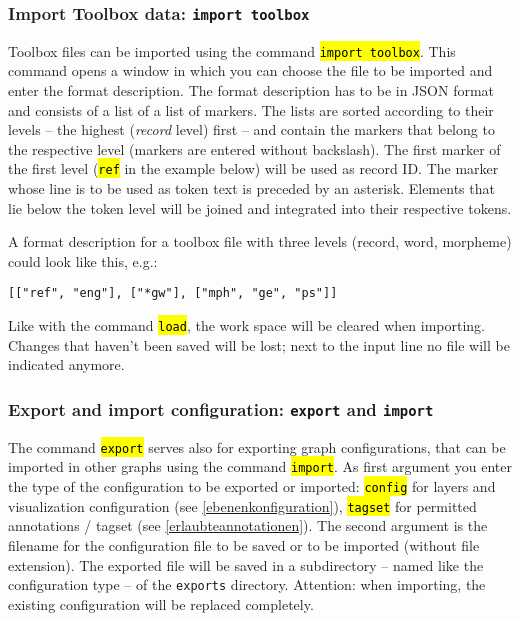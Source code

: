 \documentclass[12pt]{scrartcl}
\newcommand{\code}[1]{\hl{\texttt{#1}}}
\begin{document}
\subsubsection{Import Toolbox data: \texttt{import toolbox}}

Toolbox files can be imported using the command \code{import toolbox}.
This command opens a window in which you can choose the file to be imported and enter the format description.
The format description has to be in JSON format and consists of a list of a list of markers.
The lists are sorted according to their levels – the highest (\textit{record} level) first – and contain the markers that belong to the respective level (markers are entered without backslash).
The first marker of the first level (\code{ref} in the example below) will be used as record ID.
The marker whose line is to be used as token text is preceded by an asterisk.
Elements that lie below the token level will be joined and integrated into their respective tokens.

A format description for a toolbox file with three levels (record, word, morpheme) could look like this, e.g.:

\begin{lstlisting}[gobble=4]
	[["ref", "eng"], ["*gw"], ["mph", "ge", "ps"]]
\end{lstlisting}

Like with the command \code{load}, the work space will be cleared when importing.
Changes that haven’t been saved will be lost; next to the input line no file will be indicated anymore.


\subsubsection{Export and import configuration: \texttt{export} and \texttt{import}}

The command \code{export} serves also for exporting graph configurations, that can be imported in other graphs using the command \code{import}.
As first argument you enter the type of the configuration to be exported or imported: \code{config} for layers and visualization configuration (see \ref{ebenenkonfiguration}), \code{tagset} for permitted annotations / tagset (see \ref{erlaubteannotationen}).
The second argument is the filename for the configuration file to be saved or to be imported (without file extension).
The exported file will be saved in a subdirectory – named like the configuration type – of the \texttt{exports} directory.
Attention: when importing, the existing configuration will be replaced completely.
\end{document}
